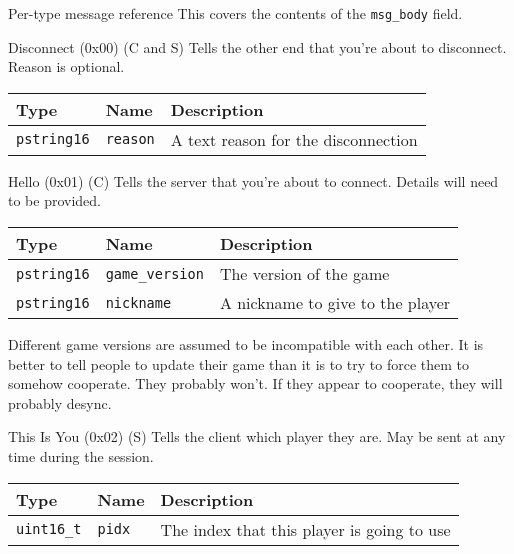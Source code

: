 \documentclass[a4paper,draft]{article}
\begin{document}
\begin{section}{Per-type message reference}
  This covers the contents of the \texttt{msg\_body} field.

  \begin{subsection}{Disconnect (0x00) (C and S)}
    Tells the other end that you're about to disconnect. Reason is optional.

    \begin{tabular}{lll}
      \hline
      Type & Name & Description \\
      \hline
      \texttt{pstring16} & \texttt{reason} & A text reason for the disconnection \\
      \hline
    \end{tabular}
  \end{subsection}

  \begin{subsection}{Hello (0x01) (C)}
    Tells the server that you're about to connect. Details will need to be provided.

    \begin{tabular}{lll}
      \hline
      Type & Name & Description \\
      \hline
      \texttt{pstring16} & \texttt{game\_version} & The version of the game \\
      \texttt{pstring16} & \texttt{nickname} & A nickname to give to the player \\
      \hline
    \end{tabular}

    Different game versions are assumed to be incompatible with each other. It is better to tell people to update their game than it is to try to force them to somehow cooperate. They probably won't. If they appear to cooperate, they will probably desync.

  \end{subsection}

  \begin{subsection}{This Is You (0x02) (S)}
    Tells the client which player they are.
    May be sent at any time during the session.

    \begin{tabular}{lll}
      \hline
      Type & Name & Description \\
      \hline
      \texttt{uint16\_t} & \texttt{pidx} & The index that this player is going to use \\
      \hline
    \end{tabular}
  \end{subsection}


\end{section}
\end{document}
